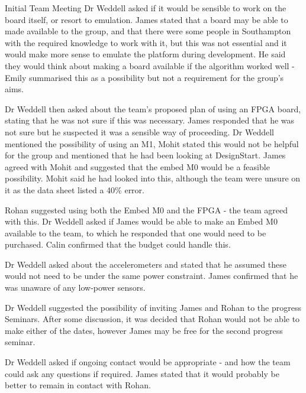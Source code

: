 \documentclass{article}
\begin{document}
\begin{Minutes}{Initial Team Meeting}
Dr Weddell asked if it would be sensible to work on the board itself, or resort to emulation. James
stated that a board may be able to made available to the group, and that there were some people in
Southampton with the required knowledge to work with it, but this was not essential and it would
make more sense to emulate the platform during development. He said they would think about making a
board available if the algorithm worked well - Emily summarised this as a possibility but not a
requirement for the group's aims.

Dr Weddell then asked about the team's proposed plan of using an FPGA board, stating that he was not
sure if this was necessary. James responded that he was not sure but he suspected it was a sensible
way of proceeding. Dr Weddell mentioned the possibility of using an M1, Mohit stated this would not
be helpful for the group and mentioned that he had been looking at DesignStart. James agreed with
Mohit and suggested that the embed M0 would be a feasible possibility. Mohit said he had looked into
this, although the team were unsure on it as the data sheet listed a 40\% error.

Rohan suggested using both the Embed M0 and the FPGA - the team agreed with this. Dr Weddell asked if
James would be able to make an Embed M0 available to the team, to which he responded that one would
need to be purchased. Calin confirmed that the budget could handle this.


Dr Weddell asked about the accelerometers and stated that he assumed these would not need to be under
the same power constraint. James confirmed that he was unaware of any low-power sensors.

Dr Weddell suggested the possibility of inviting James and Rohan to the progress Seminars. After some
discussion, it was decided that Rohan would not be able to make either of the dates, however James
may be free for the second progress seminar.

Dr Weddell asked if ongoing contact would be appropriate - and how the team could ask any questions if
required. James stated that it would probably be better to remain in contact with Rohan.


\end{Minutes}
\end{document}
